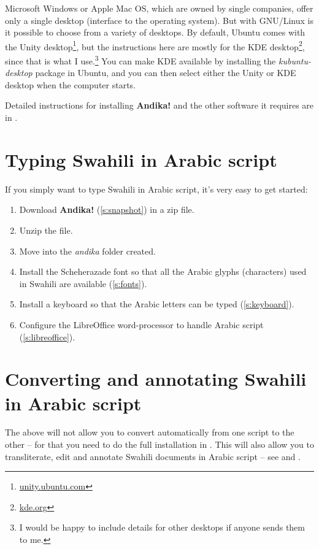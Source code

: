 Microsoft Windows or Apple Mac OS, which are owned by single companies, offer only a single desktop (interface to the operating system).  But with GNU/Linux is it possible to choose from a variety of desktops.  By default, Ubuntu comes with the Unity desktop\footnote{\url{unity.ubuntu.com}}, but the instructions here are mostly for the KDE desktop\footnote{\url{kde.org}}, since that is what I use.\footnote{I would be happy to include details for other desktops if anyone sends them to me.}  You can make KDE available by installing the \textit{kubuntu-desktop} package in Ubuntu, and you can then select either  the Unity or KDE desktop when the computer starts.

Detailed instructions for installing \textbf{Andika!} and the other software it requires are in .

\section{Typing Swahili in Arabic script}

If you simply want to type Swahili in Arabic script, it's very easy to get started:
\begin{enumerate}
\item Download \textbf{Andika!} (\ref{s:snapshot}) in a zip file.
\item Unzip the file.
\item Move into the \textit{andika} folder created.
\item Install the Scheherazade font so that all the Arabic glyphs (characters) used in Swahili are available (\ref{s:fonts}).
\item Install a keyboard so that the Arabic letters can be typed (\ref{s:keyboard}).
\item Configure the LibreOffice word-processor to handle Arabic script (\ref{s:libreoffice}).
\end{enumerate}

\section{Converting and annotating Swahili in Arabic script}

The above will not allow you to convert automatically from one script to the other -- for that you need to do the full installation in .  This will also allow you to transliterate, edit and annotate Swahili documents in Arabic script -- see   and .

